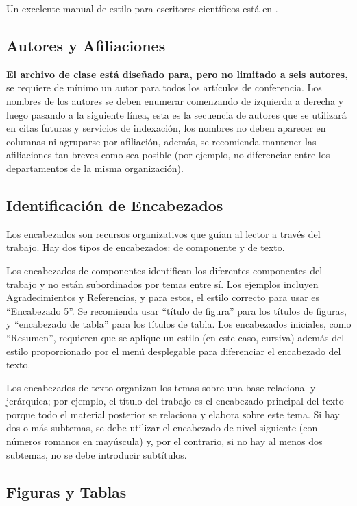 \documentclass[letterpaper, 10pt, conference]{IEEEtran} %
\begin{document}
	Un excelente manual de estilo para escritores científicos está en \cite{referenciaBibliografica3}.
	
	\subsection{Autores y Afiliaciones} \label{subseccionAutoresYAfiliaciones}
	\textbf{El archivo de clase está diseñado para, pero no limitado a seis autores,} se requiere de mínimo un autor para todos los artículos de conferencia. Los nombres de los autores se deben enumerar comenzando de izquierda a derecha y luego pasando a la siguiente línea, esta es la secuencia de autores que se utilizará en citas futuras y servicios de indexación, los nombres no deben aparecer en columnas ni agruparse por afiliación, además, se recomienda mantener las afiliaciones tan breves como sea posible (por ejemplo, no diferenciar entre los departamentos de la misma organización).
	
	\subsection{Identificación de Encabezados} \label{subseccionIdentificacionDeEncabezados}
	Los encabezados son recursos organizativos que guían al lector a través del trabajo. Hay dos tipos de encabezados: de componente y de texto.
	
	Los encabezados de componentes identifican los diferentes componentes del trabajo y no están subordinados por temas entre sí. Los ejemplos incluyen Agradecimientos y Referencias, y para estos, el estilo correcto para usar es ``Encabezado 5''. Se recomienda usar ``título de figura'' para los títulos de figuras, y ``encabezado de tabla'' para los títulos de tabla. Los encabezados iniciales, como ``Resumen'', requieren que se aplique un estilo (en este caso, cursiva) además del estilo proporcionado por el menú desplegable para diferenciar el encabezado del texto.
	
	Los encabezados de texto organizan los temas sobre una base relacional y jerárquica; por ejemplo, el título del trabajo es el encabezado principal del texto porque todo el material posterior se relaciona y elabora sobre este tema. Si hay dos o más subtemas, se debe utilizar el encabezado de nivel siguiente (con números romanos en mayúscula) y, por el contrario, si no hay al menos dos subtemas, no se debe introducir subtítulos.
	
	\subsection{Figuras y Tablas} \label{subseccionFigurasYTablas}
\end{document}
